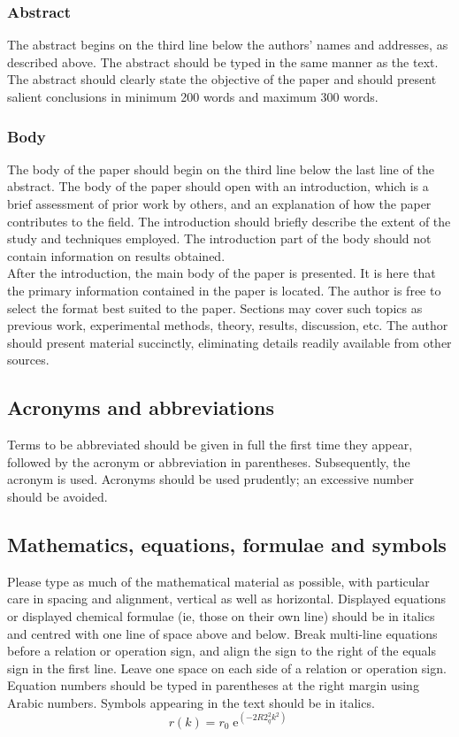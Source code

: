 \documentclass[12pt, a4paper]{article}
\DeclareMathOperator{\e}{e}
\begin{document}
\subsubsection{Abstract}
The abstract begins on the third line below the authors' names and addresses, as described above. The abstract should be typed in the same manner as the text. The abstract should clearly state the objective of the paper and should present salient conclusions in minimum 200 words and maximum 300 words.

\subsubsection{Body}
The body of the paper should begin on the third line below the last line of the abstract. The body of the paper should open with an introduction, which is a brief assessment of prior work by others, and an explanation of how the paper contributes to the field. The introduction should briefly describe the extent of the study and techniques employed. The introduction part of the body should not contain information on results obtained.\\

After the introduction, the main body of the paper is presented. It is here that the primary information contained in the paper is located. The author is free to select the format best suited to the paper. Sections may cover such topics as previous work, experimental methods, theory, results, discussion, etc. The author should present material succinctly, eliminating details readily available from other sources.

\subsection{Acronyms and abbreviations}
Terms to be abbreviated should be given in full the first time they appear, followed by the acronym or abbreviation in parentheses. Subsequently, the acronym is used. Acronyms should be used prudently; an excessive number should be avoided.

\subsection{Mathematics, equations, formulae and symbols}
Please type as much of the mathematical material as possible, with particular care in spacing and alignment, vertical as well as horizontal. Displayed equations or displayed chemical formulae (ie, those on their own line) should be in italics and centred with one line of space above and below. Break multi-line equations before a relation or operation sign, and align the sign to the right of the equals sign in the first line. Leave one space on each side of a relation or operation sign. Equation numbers should be typed in parentheses at the right margin using Arabic numbers. Symbols appearing in the text should be in italics.
\begin{equation}
  r(k) = r_0 \e^{\left(-2R2^2_qk^2\right)}
\end{equation}
\end{document}

